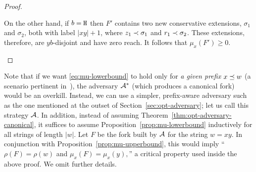 \begin{proof}
\begin{description}[font=\normalfont\itshape\space]
      On the other hand, if $b = \mathtt{H}$ then 
      $F'$ contains two new conservative extensions, 
      $\sigma_1$ and $\sigma_2$, 
      both with label $|xy| + 1$, 
      where $z_1 \prec \sigma_1$ and $r_1 \prec \sigma_2$.  
      These extensions, therefore, are $yb$-disjoint 
      and have zero reach.
      It follows that $\mu_x(F') \geq 0$.
  \end{description}
\end{proof}


Note that 
if we want \eqref{eq:mu-lowerbound} 
to hold only for \emph{a given prefix} $x \preceq w$ 
(a scenario pertinent in~\cite{LinearConsistencySODA}), 
the adversary $\mathcal{A}^*$ 
(which produces a canonical fork) 
would be an overkill. 
Instead, 
we can use a simpler, prefix-aware adversary 
such as the one mentioned 
at the outset of Section~\ref{sec:opt-adversary}; 
let us call this strategy $\mathcal{A}$. 
In addition, 
instead of assuming Theorem~\ref{thm:opt-adversary-canonical}, 
it suffices to assume 
Proposition~\ref{prop:mu-lowerbound} inductively 
for all strings of length $|w|$. 
Let $F$ be the fork 
built by $\mathcal{A}$ for the string $w = xy$.
In conjunction with Proposition~\ref{prop:mu-upperbound}, 
this would imply ``$\rho(F) = \rho(w)$ and 
$\mu_x(F) = \mu_x(y),$'' 
a critical property used inside the above proof. 
We omit further details.



